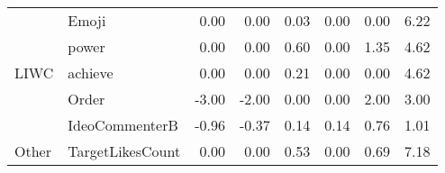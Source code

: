 \begin{table}[!h]
\begin{tabular}[t]{llrrrrrr}
 & Emoji & 0.00 & 0.00 & 0.03 & 0.00 & 0.00 & 6.22\\
\cmidrule{2-8}
 & power & 0.00 & 0.00 & 0.60 & 0.00 & 1.35 & 4.62\\
\cmidrule{2-8}
\multirow{-33}{*}{\raggedright\arraybackslash LIWC} & achieve & 0.00 & 0.00 & 0.21 & 0.00 & 0.00 & 4.62\\
\cmidrule{1-8}
 & Order & -3.00 & -2.00 & 0.00 & 0.00 & 2.00 & 3.00\\
\cmidrule{2-8}
 & IdeoCommenterB & -0.96 & -0.37 & 0.14 & 0.14 & 0.76 & 1.01\\
\cmidrule{2-8}
\multirow{-3}{*}{\raggedright\arraybackslash Other} & TargetLikesCount & 0.00 & 0.00 & 0.53 & 0.00 & 0.69 & 7.18\\
\bottomrule
\end{tabular}
\end{table}
